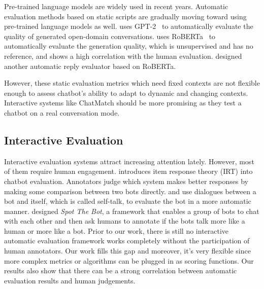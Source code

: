 Pre-trained language models are widely used in recent years.
Automatic evaluation methods based on static scripts are gradually 
moving toward using pre-trained language models as well. 
\citet{pang-etal-2020-towards} uses GPT-2~\citep{gpt2} to 
automatically evaluate the quality of generated open-domain conversations. 
\citet{mehri-eskenazi-2020-usr} uses RoBERTa~\citep{roberta} to 
automatically evaluate the generation quality, which is unsupervised 
and has no reference, and shows a high correlation with the human evaluation. 
\citet{zhao-etal-2020-designing} designed another automatic reply evaluator based on RoBERTa. 

However, these static evaluation metrics which need fixed contexts are not 
flexible enough to assess chatbot's ability to adapt to dynamic and changing
contexts. Interactive systems like ChatMatch should be more 
promising as they test a chatbot on a real conversation mode. 

\subsection{Interactive Evaluation}
Interactive evaluation systems attract increasing attention lately. 
However, most of them require human engagement. 
\citet{sedoc-ungar-2020-item} introduces item response theory (IRT) 
into chatbot evaluation. Annotators judge which system makes better
responses by making some comparison between two bots directly. 
\citet{DBLP:journals/corr/abs-1906-09308} and 
\citet{deriu-cieliebak-2019-towards} use dialogues between a bot and itself, 
which is called self-talk, to evaluate the bot in a more automatic manner. 
\citet{deriu-etal-2020-spot} designed \textit{Spot The Bot}, 
a framework that enables a group of bots to chat with each other and 
then ask humans to annotate if the bots talk more like a human or more like a
bot. Prior to our work, there is still no interactive automatic evaluation 
framework works completely without the participation of human annotators. 
Our work fills this gap and moreover, it's very flexible since more complex
metrics or algorithms can be plugged in as scoring functions.
Our results also show that there can be a strong 
correlation between automatic evaluation results and human judgements.

